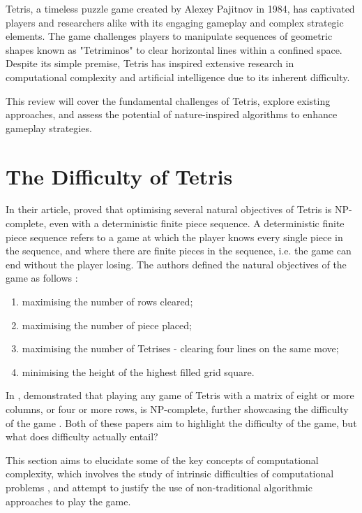 \documentclass[a4paper, 12pt]{extreport}
\begin{document}
	Tetris, a timeless puzzle game created by Alexey Pajitnov in 1984, has captivated players and researchers alike with its engaging gameplay and complex strategic elements. The game challenges players to manipulate sequences of geometric shapes known as "Tetriminos" to clear horizontal lines within a confined space. Despite its simple premise, Tetris has inspired extensive research in computational complexity and artificial intelligence due to its inherent difficulty.
	
	This review will cover the fundamental challenges of Tetris, explore existing approaches, and assess the potential of nature-inspired algorithms to enhance gameplay strategies.	
	
	\section{The Difficulty of Tetris} \label{sec:diff-of-tetris}
	
	In their article, \citeauthor{tetris-is-hard-even-to-approx} \cite{tetris-is-hard-even-to-approx} proved that optimising several natural objectives of Tetris is NP-complete, even with a deterministic finite piece sequence. A deterministic finite piece sequence refers to a game at which the player knows every single piece in the sequence, and where there are finite pieces in the sequence, i.e. the game can end without the player losing. The authors defined the natural objectives of the game as follows \cite{tetris-is-hard-even-to-approx}:
	
	\begin{enumerate}
		\item maximising the number of rows cleared;
		\item maximising the number of piece placed;
		\item maximising the number of Tetrises - clearing four lines on the same move;
		\item minimising the height of the highest filled grid square.
	\end{enumerate}
	
	In \citeyear{tetris-o1-np-hard}, \citeauthor{tetris-o1-np-hard} \cite{tetris-o1-np-hard} demonstrated that playing any game of Tetris with a matrix of eight or more columns, or four or more rows, is NP-complete, further showcasing the difficulty of the game . Both of these papers aim to highlight the difficulty of the game, but what does difficulty actually entail?
	
	This section aims to elucidate some of the key concepts of computational complexity, which involves the study of intrinsic difficulties of computational problems \cite{cc:conceptual-perspective}, and attempt to justify the use of non-traditional algorithmic approaches to play the game.
	
\end{document}
